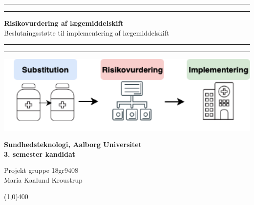 \clearpage
\thispagestyle{empty}


\begin{center}	
	\rule{\textwidth}{1.6pt}\vspace*{-\baselineskip}\vspace*{2pt} %
	\rule{\textwidth}{0.4pt} %
	
	\vspace{1.2\baselineskip} %
	
	{\Huge \textbf{Risikovurdering af lægemiddelskift}} \\ \vspace{3mm}%
	{\LARGE Beslutningsstøtte til implementering af lægemiddelskift}
	\vspace{1\baselineskip} %
	
	\rule{\textwidth}{0.4pt}\vspace*{-\baselineskip}\vspace{3.2pt} %
	\rule{\textwidth}{1.6pt} %
	
	\vspace{7\baselineskip} %
		\includegraphics[width=1\textwidth]{billeder/forside.png} \\
		\vspace{5cm}
	 		\begin{Large}
	 		\textbf{Sundhedsteknologi, Aalborg Universitet  \\ 3. semester kandidat}\\
		\vspace{1cm}
			\end{Large}
	{\Large Projekt gruppe 18gr9408 \\
	Maria Kaalund Kroustrup}
\end{center}
\vspace*{\fill}

\begin{center}
	\line(1,0){400}
\end{center}



